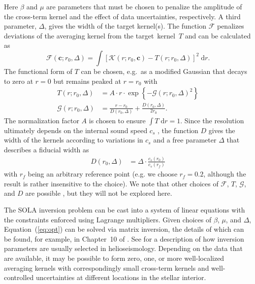 \fi
Here $\beta$ and $\mu$ are parameters that must be chosen to penalize the amplitude of the cross-term kernel and the effect of data uncertainties, respectively. 
A third parameter, $\Delta$, gives the width of the target kernel(s). 
The function $\mathscr{F}$ penalizes deviations of the averaging kernel from the target~kernel~$T$ and can be calculated as
\begin{equation}
        \mathscr{F}(\mathbf c; r_0, \Delta)
        =  
        \int \left[ \mathscr{K}(r; r_0, \mathbf c) - T(r; r_0, \Delta) \right]^2 \; \text{d}r. 
\end{equation}
The functional form of $T$ can be chosen, e.g.~as a modified Gaussian that decays to zero at ${r=0}$ but remains peaked at ${r=r_0}$ \citep[e.g.][]{1999MNRAS.309...35R} with 
\begin{align}
    T(r; r_0, \Delta) &= A\cdot r\cdot \exp\left\{-\mathcal{G}(r; r_0, \Delta)^2\right\} \\
    \mathcal{G}(r; r_0, \Delta) &= \frac{r-r_0}{D(r_0, \Delta)} + \frac{D(r_0, \Delta)}{2 r_0}.
\end{align}
The normalization factor $A$ is chosen to ensure ${\int T \; \text{d}r = 1}$. 
Since the resolution ultimately depends on the internal sound speed $c_s$ \citep[][]{1993ASPC...42..141T}, the function $D$ gives the width of the kernels according to variations in $c_s$ and a free parameter $\Delta$ that describes a fiducial width as 
\begin{align}
    D(r_0, \Delta) &= \Delta \cdot \frac{c_s(r_0)}{c_s(r_f)} 
\end{align}
with $r_f$ being an arbitrary reference point (e.g. we choose ${r_f=0.2}$, although the result is rather insensitive to the choice). 
We note that other choices of $\mathscr{F}$, $T$, $\mathcal{G}$, and $D$ are possible \citep[see, e.g.,][]{1985SoPh..100...65G, 1989ApJ...343..526B}, but they will not be explored here. 

The SOLA inversion problem can be cast into a system of linear equations with the constraints enforced using Lagrange multipliers. 
Given choices of $\beta$, $\mu$, and $\Delta$, Equation~(\ref{eq:opt}) can be solved via matrix inversion, the details of which can be found, for example, in Chapter~10 of \citealt{basuchaplin2017}. 
See \citet{1999MNRAS.309...35R} for a description of how inversion parameters are usually selected in helioseismology. 
Depending on the data that are available, it may be possible to form zero, one, or more well-localized averaging kernels with correspondingly small cross-term kernels and well-controlled uncertainties at different locations in the stellar interior. 


